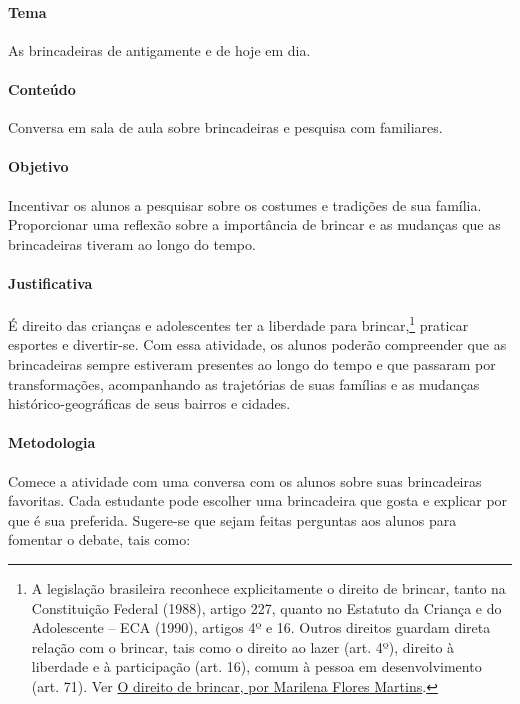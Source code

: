 \documentclass[11pt]{extarticle}
\begin{document}
\paragraph{Tema} As brincadeiras de antigamente e de hoje em dia.

\paragraph{Conteúdo} Conversa em sala de aula sobre brincadeiras e pesquisa com familiares.

\paragraph{Objetivo} Incentivar os alunos a pesquisar sobre os costumes e tradições de sua família. Proporcionar uma reflexão sobre a importância de brincar e as mudanças que as brincadeiras tiveram ao longo do tempo.

\paragraph{Justificativa} É direito das crianças e adolescentes ter a liberdade para brincar,\footnote{A legislação brasileira reconhece explicitamente o direito de brincar, tanto na Constituição Federal (1988), artigo 227, quanto no Estatuto da Criança e do Adolescente – ECA (1990), artigos 4º e 16. Outros direitos guardam direta relação com o brincar, tais como o direito ao lazer (art. 4º), direito à liberdade e à participação (art. 16), comum à pessoa em desenvolvimento (art. 71). Ver 
\href{http://primeirainfancia.org.br/eca-e-o-direito-de-brincar-por-marilena-flores-martins-do-ipa-brasil/}{O direito de brincar, por Marilena Flores Martins}.
} 
praticar esportes e divertir-se. Com essa atividade, os alunos poderão compreender que as brincadeiras sempre estiveram presentes ao longo do tempo e que passaram por transformações, acompanhando as trajetórias de suas famílias e as mudanças histórico-geográficas de seus bairros e cidades. 

\paragraph{Metodologia} Comece a atividade com uma conversa com os alunos sobre suas brincadeiras favoritas. Cada estudante pode escolher uma brincadeira que gosta e explicar por que é sua preferida. Sugere-se que sejam feitas perguntas aos alunos para fomentar o debate, tais como:
\end{document}
